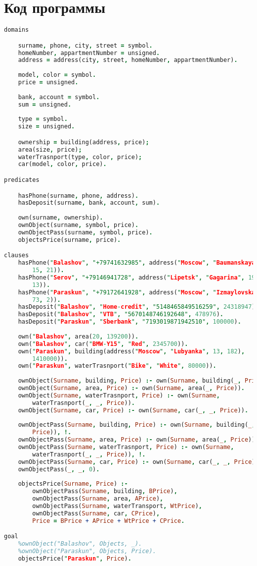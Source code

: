 \documentclass[14pt,a4paper]{scrreprt}
\begin{document}
\section{Код программы}

\begin{lstlisting}[language=Prolog]
domains    

	surname, phone, city, street = symbol.    
	homeNumber, appartmentNumber = unsigned.
	address = address(city, street, homeNumber, appartmentNumber). 
	
	model, color = symbol.   
	price = unsigned.      
	
	bank, account = symbol.   
	sum = unsigned.    
	
	type = symbol.   
	size = unsigned.      

	ownership = building(address, price); 
	area(size, price); 
	waterTrasnport(type, color, price); 
	car(model, color, price).  

predicates    

	hasPhone(surname, phone, address).   
	hasDeposit(surname, bank, account, sum).      
	
	own(surname, ownership).   
	ownObject(surname, symbol, price).
	ownObjectPass(surname, symbol, price).  
	objectsPrice(surname, price).

clauses    
	hasPhone("Balashov", "+79741632985", address("Moscow", "Baumanskaya", 
		15, 21)).   
	hasPhone("Serov", "+79146941728", address("Lipetsk", "Gagarina", 192, 
		13)).   
	hasPhone("Paraskun", "+79172641928", address("Moscow", "Izmaylovskaya",
		73, 2)).    
	hasDeposit("Balashov", "Home-credit", "5148465849516259", 24318947).   
	hasDeposit("Balashov", "VTB", "5670148746192648", 478976).   
	hasDeposit("Paraskun", "Sberbank", "7193019871942510", 100000).
	
	own("Balashov", area(20, 139200)).   
	own("Balashov", car("BMW-Y15", "Red", 2345700)).   
	own("Paraskun", building(address("Moscow", "Lubyanka", 13, 182),
		1410000)).   
	own("Paraskun", waterTrasnport("Bike", "White", 80000)).
	
	ownObject(Surname, building, Price) :- own(Surname, building(_, Price)).
	ownObject(Surname, area, Price) :- own(Surname, area(_, Price)).
	ownObject(Surname, waterTrasnport, Price) :- own(Surname, 
		waterTrasnport(_, _, Price)).
	ownObject(Surname, car, Price) :- own(Surname, car(_, _, Price)).
	
	ownObjectPass(Surname, building, Price) :- own(Surname, building(_, 
		Price)), !.
	ownObjectPass(Surname, area, Price) :- own(Surname, area(_, Price)), !.
	ownObjectPass(Surname, waterTrasnport, Price) :- own(Surname, 
		waterTrasnport(_, _, Price)), !.
	ownObjectPass(Surname, car, Price) :- own(Surname, car(_, _, Price)), !.
	ownObjectPass(_, _, 0).
	
	objectsPrice(Surname, Price) :- 
		ownObjectPass(Surname, building, BPrice),
		ownObjectPass(Surname, area, APrice),
		ownObjectPass(Surname, waterTransport, WtPrice),
		ownObjectPass(Surname, car, CPrice),
		Price = BPrice + APrice + WtPrice + CPrice.

goal
	%ownObject("Balashov", Objects, _).
	%ownObject("Paraskun", Objects, Price).
	objectsPrice("Paraskun", Price).
\end{lstlisting}
\end{document}
